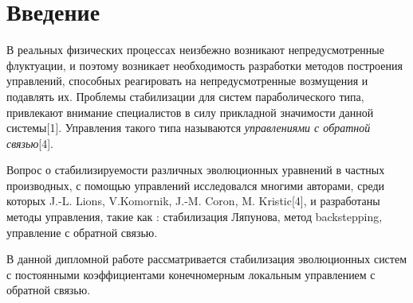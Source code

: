\section*{Введение}
\vspace{1em}

В реальных физических процессах неизбежно возникают непредусмотренные 
флуктуации, и поэтому возникает необходимость разработки методов построения 
управлений, способных реагировать на непредусмотренные возмущения и подавлять 
их. Проблемы стабилизации для систем параболического типа, привлекают внимание 
специалистов в силу прикладной значимости данной системы[1]. Управления такого 
типа называются \emph{управлениями с обратной связью}[4].

Вопрос о стабилизируемости различных эволюционных уравнений в частных 
производных, с помощью управлений исследовался многими авторами, среди которых 
J.-L. Lions, V.Komornik, J.-M. Coron, M. Kristic[4], и разработаны методы 
управления, такие как : стабилизация Ляпунова, метод backstepping, управление 
с обратной связью.

В данной дипломной работе рассматривается стабилизация эволюционных систем с 
постоянными коэффициентами конечномерным локальным управлением с обратной связью.
